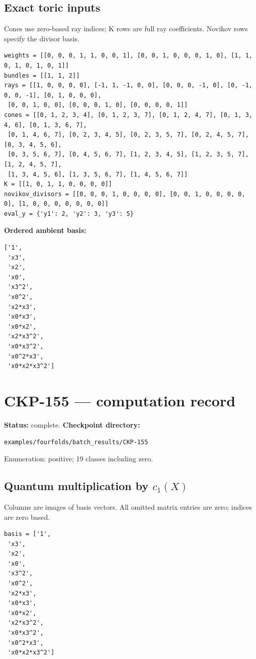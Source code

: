 \documentclass[10pt,a4paper]{article}
\begin{document}
\subsection*{Exact toric inputs}
Cones use zero-based ray indices; K rows are full ray coefficients. Novikov rows specify the divisor basis.

\begin{lstlisting}
weights = [[0, 0, 0, 1, 1, 0, 0, 1], [0, 0, 1, 0, 0, 0, 1, 0], [1, 1, 0, 1, 0, 1, 0, 1]]
bundles = [[1, 1, 2]]
rays = [[1, 0, 0, 0, 0], [-1, 1, -1, 0, 0], [0, 0, 0, -1, 0], [0, -1, 0, 0, -1], [0, 1, 0, 0, 0],
 [0, 0, 1, 0, 0], [0, 0, 0, 1, 0], [0, 0, 0, 0, 1]]
cones = [[0, 1, 2, 3, 4], [0, 1, 2, 3, 7], [0, 1, 2, 4, 7], [0, 1, 3, 4, 6], [0, 1, 3, 6, 7],
 [0, 1, 4, 6, 7], [0, 2, 3, 4, 5], [0, 2, 3, 5, 7], [0, 2, 4, 5, 7], [0, 3, 4, 5, 6],
 [0, 3, 5, 6, 7], [0, 4, 5, 6, 7], [1, 2, 3, 4, 5], [1, 2, 3, 5, 7], [1, 2, 4, 5, 7],
 [1, 3, 4, 5, 6], [1, 3, 5, 6, 7], [1, 4, 5, 6, 7]]
K = [[1, 0, 1, 1, 0, 0, 0, 0]]
novikov_divisors = [[0, 0, 0, 1, 0, 0, 0, 0], [0, 0, 1, 0, 0, 0, 0, 0], [1, 0, 0, 0, 0, 0, 0, 0]]
eval_y = {'y1': 2, 'y2': 3, 'y3': 5}
\end{lstlisting}

\textbf{Ordered ambient basis:}
\begin{lstlisting}
['1',
 'x3',
 'x2',
 'x0',
 'x3^2',
 'x0^2',
 'x2*x3',
 'x0*x3',
 'x0*x2',
 'x2*x3^2',
 'x0*x3^2',
 'x0^2*x3',
 'x0*x2*x3^2']
\end{lstlisting}

\clearpage\section*{CKP-155 --- computation record}
\textbf{Status:} complete.
\textbf{Checkpoint directory:}
\begin{lstlisting}
examples/fourfolds/batch_results/CKP-155
\end{lstlisting}

Enumeration: positive; 19 classes including zero.
\subsection*{Quantum multiplication by $c_1(X)$}
Columns are images of basis vectors. All omitted matrix entries are zero; indices are zero based.

\begin{lstlisting}
basis = ['1',
 'x3',
 'x2',
 'x0',
 'x3^2',
 'x0^2',
 'x2*x3',
 'x0*x3',
 'x0*x2',
 'x2*x3^2',
 'x0*x3^2',
 'x0^2*x3',
 'x0*x2*x3^2']
\end{lstlisting}
\end{document}
